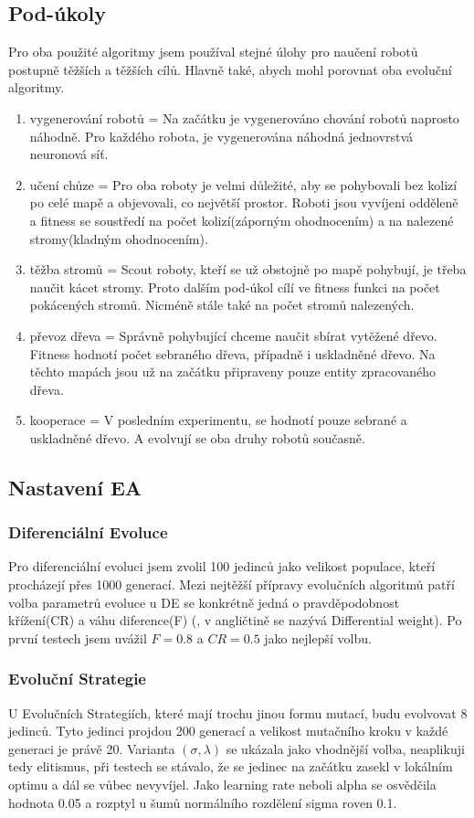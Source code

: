 \subsection{Pod-úkoly} 
Pro oba použité algoritmy jsem používal stejné úlohy pro naučení robotů postupně těžších a těžších cílů. Hlavně také, abych mohl porovnat oba evoluční algoritmy.  
\begin{enumerate}
        \item vygenerování robotů = Na začátku je vygenerováno chování robotů naprosto náhodně. Pro každého robota, je vygenerována náhodná jednovrstvá neuronová síť. 
        \item učení chůze = Pro oba roboty je velmi důležité, aby se pohybovali bez kolizí po celé mapě a objevovali, co největší prostor. Roboti jsou vyvíjeni odděleně a fitness se soustředí na počet kolizí(záporným ohodnocením) a na nalezené stromy(kladným ohodnocením).
        \item těžba stromů = Scout roboty, kteří se už obstojně po mapě pohybují, je třeba naučit kácet stromy. Proto dalším pod-úkol cílí ve fitness funkci na počet pokácených stromů. Nicméně stále také na počet stromů nalezených. 
        \item převoz dřeva = Správně pohybující chceme naučit sbírat vytěžené dřevo. Fitness hodnotí počet sebraného dřeva, případně i uskladněné dřevo. Na těchto mapách jsou už na začátku připraveny pouze entity zpracovaného dřeva.
        \item kooperace = V posledním experimentu, se hodnotí pouze sebrané a uskladněné dřevo. A evolvují se oba druhy robotů současně. 
\end{enumerate}

\subsection{Nastavení EA}
\subsubsection{Diferenciální Evoluce}
Pro diferenciální evoluci jsem zvolil 100 jedinců jako velikost populace, kteří procházejí přes 1000 generací. Mezi nejtěžší přípravy evolučních algoritmů patří volba parametrů evoluce u DE se konkrétně jedná o pravděpodobnost křížení(CR) a váhu diference(F) (, v angličtině se nazývá Differential weight). Po první testech jsem uvážil $F = 0.8 $ a $CR = 0.5$ jako nejlepší volbu. 
\subsubsection{Evoluční Strategie}
U Evolučních Strategiích, které mají trochu jinou formu mutací, budu evolvovat 8 jedinců. Tyto jedinci projdou 200 generací a velikost mutačního kroku  v každé generaci je právě 20. Varianta $(\sigma,\lambda)$ se ukázala jako vhodnější volba, neaplikuji tedy elitismus, při testech se stávalo, že se jedinec na začátku zasekl v lokálním optimu a dál se vůbec nevyvíjel. Jako learning rate neboli alpha se osvědčila hodnota 0.05 a rozptyl u šumů normálního rozdělení sigma roven 0.1.
